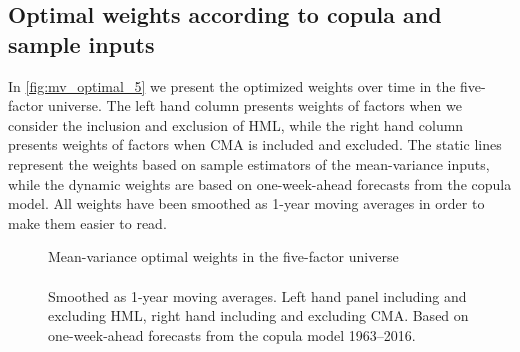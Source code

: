 \subsection{Optimal weights according to copula and sample inputs}
In \autoref{fig:mv_optimal_5} we present the optimized weights over time in the five-factor universe. The left hand column presents weights of factors when we consider the inclusion and exclusion of HML, while the right hand column presents weights of factors when CMA is included and excluded. The static lines represent the weights based on sample estimators of the mean-variance inputs, while the dynamic weights are based on one-week-ahead forecasts from the copula model. All weights have been smoothed as 1-year moving averages in order to make them easier to read. 

\begin{figure}[htbp]
  \centering
  \footnotesize
  \renewcommand{\arraystretch}{1.2}
  \caption{Mean-variance optimal weights in the five-factor universe \\ \quad \\ Smoothed as 1-year moving averages. Left hand panel including and excluding HML, right hand including and excluding CMA. Based on one-week-ahead forecasts from the copula model 1963--2016.}
  \label{fig:mv_optimal_5}

\end{figure}
